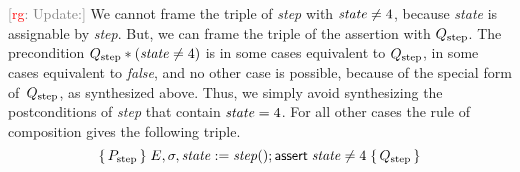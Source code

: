\documentclass{article} %
\newcommand{\3}[3]{\{\,#1\,\}\;#2\;\{\,#3\,\}}
\renewcommand{\*}{\,*\,}
\newcommand{\noterg}[2]{\textcolor{gray}{[\textcolor{red}{#1}: #2]}}
\newcommand{\rg}[1]{\noterg{rg}{#1}}
\begin{document}
\rg{Update:}
We cannot frame the triple of {\it step\/} with ${\it state}\ne4$, because {\it state\/} is assignable by {\it step}.
But, we can frame the triple of the assertion with $Q_{\rm step}$.
The precondition $Q_{\rm step}*({\it state}\ne4)$ is in some cases equivalent to $Q_{\rm step}$, in some cases equivalent to {\it false\/}, and no other case is possible, because of the special form of~$Q_{\rm step}$, as synthesized above.
Thus, we simply avoid synthesizing the postconditions of {\it step\/} that contain ${\it state}=4$.
For all other cases the rule of composition gives the following triple.
\[\3
  {P_{\rm step}}
  {E,\sigma,{\it state}:={\it step}(); {\sf assert}\;{\it state}\ne4}
  {Q_{\rm step}} \]
\end{document}

